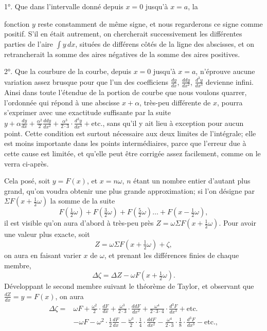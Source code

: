 \documentclass{article}
\begin{document}
1°. Que dans l'intervalle donné depuis $x=0$ jusqu'à $x=a$, la

fonction $y$ reste constamment de même signe, et nous regarderons ce signe comme positif. S'il en était autrement, on chercherait successivement les différentes parties de l'aire $\displaystyle\int y\,dx$, situées de différens côtés de la ligne des abscisses, et on retrancherait la somme des aires négatives de la somme des aires positives.

2°. Que la courbure de la courbe, depuis $x=0$ jusqu'à $x=a$, n'éprouve aucune variation assez brusque pour que l'un des coefficiens $\frac{dy}{dx}$, $\frac{ddy}{dx^{2}}$, $\frac{d^{3}y}{dx^{3}}$ devienne infini. Ainsi dans toute l'étendue de la portion de courbe que nous voulons quarrer, l'ordonnée qui répond à une abscisse $x+\alpha$, très-peu différente de $x$, pourra s'exprimer avec une exactitude suffisante par la suite $y+\alpha\frac{dy}{dx}+\frac{\alpha^{2}}{2}\frac{ddy}{dx^{2}}+\frac{\alpha^{3}}{2\cdot3}\cdot\frac{d^{3}y}{dx^{3}}+\text{etc.}$, sans qu'il y ait lieu à exception pour aucun point. Cette condition est surtout nécessaire aux deux limites de l'intégrale; elle est moins importante dans les points intermédiaires, parce que l'erreur due à cette cause est limitée, et qu'elle peut être corrigée assez facilement, comme on le verra ci-après.

Cela posé, soit $y=F(x)$, et $x=n\omega$, $n$ étant un nombre entier d'autant plus grand, qu'on voudra obtenir une plus grande approximation; si l'on désigne par $\Sigma F(x+\frac{1}{2}\omega)$ la somme de la suite
\[ F(\tfrac{1}{2}\omega)+F(\tfrac{3}{2}\omega)+F(\tfrac{5}{2}\omega)\ldots+F(x-\tfrac{1}{2}\omega), \]
il est visible qu'on aura d'abord à très-peu près $Z=\omega\Sigma F(x+\frac{1}{2}\omega)$. Pour avoir une valeur plus exacte, soit
\[ Z=\omega\Sigma F(x+\tfrac{1}{2}\omega)+\zeta, \]
on aura en faisant varier $x$ de $\omega$, et prenant les différences finies de chaque membre,
\[ \Delta\zeta=\Delta Z-\omega F(x+\tfrac{1}{2}\omega). \]
Développant le second membre suivant le théorème de Taylor, et observant que $\frac{dZ}{dx}=y=F(x)$, on aura
\[ \begin{aligned} \Delta\zeta={}&\omega F+\frac{\omega^{2}}{2}\cdot\frac{dF}{dx}+\frac{\omega^{3}}{2\cdot3}\cdot\frac{ddF}{dx^{2}}+\frac{\omega^{4}}{2\cdot3\cdot4}\cdot\frac{d^{3}F}{dx^{3}}+\text{etc.}\\ &-\omega F-\omega^{2}\cdot\frac{1}{2}\frac{dF}{dx}-\frac{\omega^{3}}{2}\cdot\frac{1}{4}\cdot\frac{ddF}{dx^{2}}-\frac{\omega^{4}}{2\cdot3}\cdot\frac{1}{8}\cdot\frac{d^{3}F}{dx^{3}}-\text{etc.}, \end{aligned} \]
\end{document}
